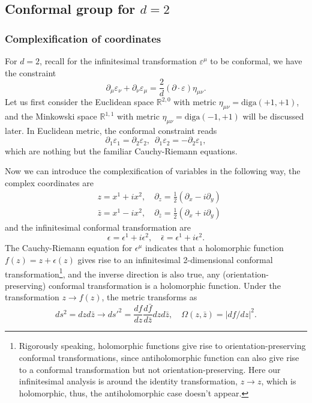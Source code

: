 \documentclass[graybox,envcountchap,sectrefs]{svmono}
\begin{document}
\subsection{Conformal group for $d=2$}

\subsubsection{Complexification of coordinates}
For $d=2$, recall for the infinitesimal transformation $\varepsilon^{\mu}$ to be conformal,  we have the constraint
\begin{equation}
\partial_{\mu}\varepsilon_{\nu}+\partial_{\nu}\varepsilon_{\mu}=\frac{2}{d}(\partial\cdot \varepsilon)\eta_{\mu\nu}.
\end{equation}
 Let us first consider the Euclidean space $\mathbb{R}^{2,0}$ with metric $\eta_{\mu\nu}=\mathrm{diga}(+1,+1)$, and the Minkowski space $\mathbb{R}^{1,1}$ with metric  
$\eta_{\mu\nu}=\mathrm{diga}(-1,+1)$ will be discussed later. In Euclidean metric, the conformal constraint reads
\begin{equation}
\partial_1\varepsilon_1=\partial_2\varepsilon_2,\,\,\, \partial_{1}\varepsilon_2=-\partial_2\varepsilon_1,
\end{equation}
which are nothing but the familiar Cauchy-Riemann equations.

Now we can introduce the complexification of variables in the following way, the complex coordinates are
\begin{align}
&z=x^1+ix^2, \quad \partial_{z}=\frac{1}{2}(\partial_x-i\partial_y)\\
&\bar{z}=x^1-ix^2,\quad \partial_{\bar{z}}=\frac{1}{2}(\partial_x+i\partial_y)
\end{align}
and the infinitesimal conformal transformation are
\begin{equation}
\epsilon=\epsilon^1+i\epsilon^2,\quad \bar{\epsilon}=\epsilon^1+i\epsilon^2.
\end{equation}
The Cauchy-Riemann equation for $\epsilon^{\mu}$ indicates that a holomorphic function $f(z)=z+\epsilon(z)$ gives rise to an infinitesimal 2-dimensional conformal transformation\footnote{Rigorously speaking, holomorphic functions give rise to orientation-preserving conformal transformations, since antiholomorphic function can also give rise to a conformal transformation but not orientation-preserving. Here our infinitesimal analysis is around the identity transformation, $z\to z$, which is holomorphic, thus, the antiholomorphic case doesn't appear.}, and the inverse direction is also true, any (orientation-preserving) conformal transformation is a holomorphic function. Under the transformation $z\to f(z)$, the metric transforms as
\begin{equation}
ds^2=dzd\bar{z}\to {ds'}^2 =\frac{d f}{dz}\frac{d \bar{f}}{d \bar{z}} dz d\bar{z}, \quad \Omega(z,\bar{z})=|d f/d z|^2.
\end{equation}
\end{document}
